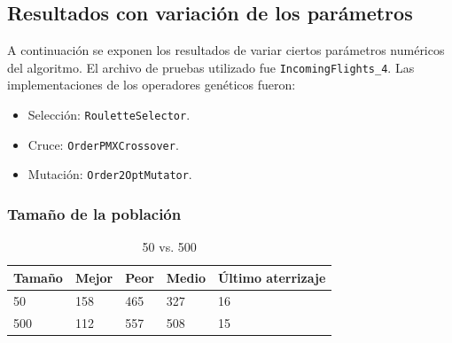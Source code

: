 \documentclass[a4paper,12pt,titlepage]{article}
\begin{document}
\subsection{Resultados con variación de los parámetros}

A continuación se exponen los resultados de variar ciertos parámetros numéricos del algoritmo. El archivo de pruebas utilizado fue \lstinline|IncomingFlights_4|. Las implementaciones de los operadores genéticos fueron:

\begin{itemize}[noitemsep]
	\item Selección: \lstinline|RouletteSelector|.
	\item Cruce: \lstinline|OrderPMXCrossover|.
	\item Mutación: \lstinline|Order2OptMutator|.	
\end{itemize}

\subsubsection{Tamaño de la población}

\begin{table}[!ht]
\centering
\begin{tabular}{@{}lllll@{}}
\toprule
Tamaño & Mejor & Peor & Medio & Último aterrizaje \\ \midrule
50     & 158   & 465  & 327   & 16                \\
500    & 112   & 557  & 508   & 15                \\ \bottomrule
\end{tabular}
\caption{50 vs. 500}
\end{table}
\end{document}

